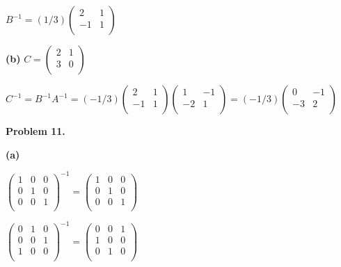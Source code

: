 \documentclass[oneside,12pt]{amsart}
\begin{document}
$
B^{-1}=
(1/3)
\begin{pmatrix}
2 & 1 \\
-1 & 1 \\
\end{pmatrix}
$

\bigskip

\textbf{(b)}
$
C=
\begin{pmatrix}
2 & 1 \\
3 & 0 \\
\end{pmatrix}
$

$
C^{-1} = B^{-1} A^{-1}=
(-1/3)
\begin{pmatrix}
2 & 1 \\
-1 & 1 \\
\end{pmatrix}
\begin{pmatrix}
1 & -1 \\
-2 & 1 \\
\end{pmatrix}
=
(-1/3)
\begin{pmatrix}
 0  & -1 \\
-3 &  2 \\
\end{pmatrix}
$


\bigskip

\textbf{Problem 11.}

\textbf{(a)}

$
\begin{pmatrix}
1 & 0 & 0 \\
0 & 1 & 0 \\
0 & 0 & 1 \\
\end{pmatrix}^{-1}
=
\begin{pmatrix}
1 & 0 & 0 \\
0 & 1 & 0 \\
0 & 0 & 1 \\
\end{pmatrix}
$

\smallskip

$
\begin{pmatrix}
0 & 1 & 0 \\
0 & 0 & 1 \\
1 & 0 & 0 \\
\end{pmatrix}^{-1}
=
\begin{pmatrix}
0 & 0 & 1 \\
1 & 0 & 0 \\
0 & 1 & 0 \\
\end{pmatrix}
$
\end{document}
